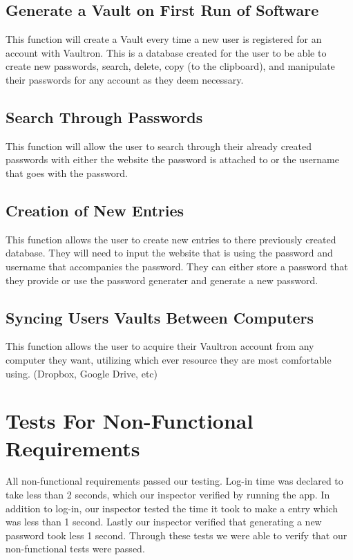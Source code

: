 \documentclass[11pt]{report}
\begin{document}
\subsection{Generate a Vault on First Run of Software}
This function will create a Vault every time a new user is registered for an account 
with Vaultron. This is a database created for the user to be able to create new
passwords, search, delete, copy (to the clipboard), and manipulate their passwords
for any account as they deem necessary.

\subsection{Search Through Passwords}
This function will allow the user to search through their already created passwords
with either the website the password is attached to or the username that goes with 
the password. 

\subsection{Creation of New Entries}
This function allows the user to create new entries to there previously created 
database. They will need to input the website that is using the password and
username that accompanies the password.  They can either store a password that
they provide or use the password generater and generate a new password.

\subsection{Syncing Users Vaults Between Computers}
This function allows the user to acquire their Vaultron account from any computer 
they want, utilizing which ever resource they are most comfortable using. (Dropbox, 
Google Drive, etc)



\section{Tests For Non-Functional Requirements}
All non-functional requirements passed our testing. Log-in time was declared to 
take less than 2 seconds, which our inspector verified by running the app. In 
addition to log-in, our inspector tested the time it took to make a entry which 
was less than 1 second. Lastly our inspector verified that generating a new 
password took less 1 second. Through these tests we were able to verify that our 
non-functional tests were passed.
\end{document}
